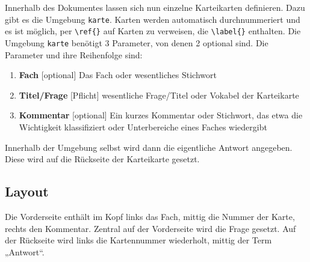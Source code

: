 \documentclass[a4paper]{article}
\begin{document}
Innerhalb des Dokumentes lassen sich nun einzelne Karteikarten definieren. Dazu gibt es die Umgebung \lstinline!karte!. Karten werden automatisch durchnummeriert und es ist möglich, per \lstinline!\ref{}! auf Karten zu verweisen, die \lstinline!\label{}! enthalten.
Die Umgebung \lstinline!karte! benötigt 3 Parameter, von denen 2 optional sind. Die Parameter und ihre Reihenfolge sind:
\begin{enumerate}[1.]
	\item \textbf{Fach} [optional] Das Fach oder wesentliches Stichwort
	\item \textbf{Titel/Frage} [Pflicht] wesentliche Frage/Titel oder Vokabel der Karteikarte
	\item \textbf{Kommentar} [optional] Ein kurzes Kommentar oder Stichwort, das etwa die Wichtigkeit klassifiziert oder Unterbereiche eines Faches wiedergibt
\end{enumerate}
Innerhalb der Umgebung selbst wird dann die eigentliche Antwort angegeben. Diese wird auf die Rückseite der Karteikarte gesetzt.

\subsection{Layout}
Die Vorderseite enthält im Kopf links das Fach, mittig die Nummer der Karte, rechts den Kommentar. Zentral auf der Vorderseite wird die Frage gesetzt. Auf der Rückseite wird links die Kartennummer wiederholt, mittig der Term „Antwort“.
\end{document}

